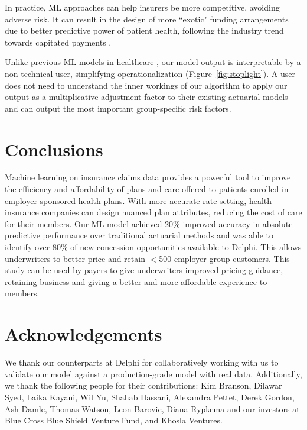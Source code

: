 \documentclass[letterpaper]{article} %
\begin{document}
In practice, ML approaches can help insurers be more competitive, avoiding adverse risk. It can result in the design of more ``exotic" funding arrangements due to better predictive power of patient health, following the industry trend towards capitated payments \cite{mngdcare}.

Unlike previous ML models in healthcare \cite{xai}, our model output is interpretable by a non-technical user, simplifying operationalization (Figure~\ref{fig:stoplight}). A user does not need to understand the inner workings of our algorithm to apply our output as a multiplicative adjustment factor to their existing actuarial models and can output the most important group-specific risk factors.

\section*{Conclusions}
Machine learning on insurance claims data provides a powerful tool to improve the efficiency and affordability of plans and care offered to patients enrolled in employer-sponsored health plans. With more accurate rate-setting, health insurance companies can design nuanced plan attributes, reducing the cost of care for their members. Our ML model achieved 20\% improved accuracy in absolute predictive performance over traditional actuarial methods and was able to identify over 80\% of new concession opportunities available to Delphi. This allows underwriters to better price and retain $<$500 employer group customers. This study can be used by payers to give underwriters improved pricing guidance, retaining business and giving a better and more affordable experience to members.

\section*{Acknowledgements}
We thank our counterparts at Delphi for collaboratively working with us to validate our model against a production-grade model with real data.  Additionally, we thank the following people for their contributions: Kim Branson, Dilawar Syed, Laika Kayani, Wil Yu, Shahab Hassani, Alexandra Pettet, Derek Gordon, Ash Damle, Thomas Watson,  Leon Barovic, Diana Rypkema and our investors at Blue Cross Blue Shield Venture Fund, and Khosla Ventures.
\end{document}
